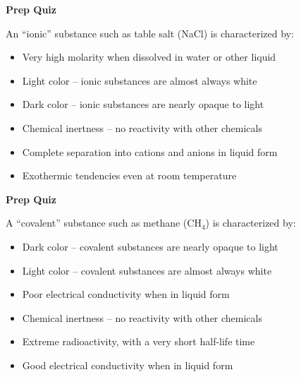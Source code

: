 \vfil \eject

\noindent
{\bf Prep Quiz}

An ``ionic'' substance such as table salt (NaCl) is characterized by:

\begin{itemize}
\item{} Very high molarity when dissolved in water or other liquid
\vskip 5pt
\item{} Light color -- ionic substances are almost always white
\vskip 5pt
\item{} Dark color -- ionic substances are nearly opaque to light
\vskip 5pt
\item{} Chemical inertness -- no reactivity with other chemicals
\vskip 5pt
\item{} Complete separation into cations and anions in liquid form
\vskip 5pt
\item{} Exothermic tendencies even at room temperature
\end{itemize}












\vfil \eject

\noindent
{\bf Prep Quiz}

A ``covalent'' substance such as methane (CH$_{4}$) is characterized by:

\begin{itemize}
\item{} Dark color -- covalent substances are nearly opaque to light
\vskip 5pt
\item{} Light color -- covalent substances are almost always white
\vskip 5pt
\item{} Poor electrical conductivity when in liquid form
\vskip 5pt
\item{} Chemical inertness -- no reactivity with other chemicals
\vskip 5pt
\item{} Extreme radioactivity, with a very short half-life time
\vskip 5pt
\item{} Good electrical conductivity when in liquid form
\end{itemize}





